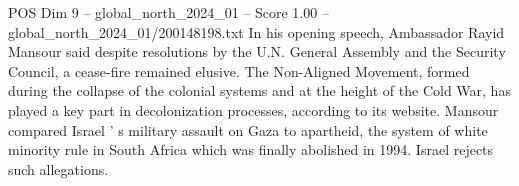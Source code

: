 \begin{textsample}{POS Dim 9 – global\_north\_2024\_01 – Score 1.00 – global\_north\_2024\_01/200148198.txt}
In his opening speech, Ambassador Rayid Mansour said despite resolutions by the U.N.
General Assembly and the Security Council, a cease-fire remained elusive.
The Non-Aligned Movement, formed during the collapse of the colonial systems and at the height of the Cold War, has played a key part in decolonization processes, according to its website.
Mansour compared Israel ' s military assault on Gaza to apartheid, the system of white minority rule in South Africa which was finally abolished in 1994.
Israel rejects such allegations.

\end{textsample}
